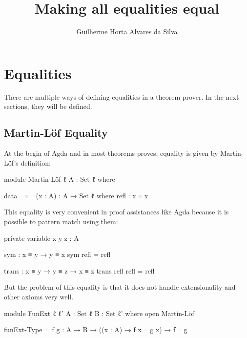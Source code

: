\documentclass{article}
\author{Guilherme Horta Alvares da Silva}
\title{Making all equalities equal}
\begin{document}


\maketitle

\begin{abstract}

\end{abstract}


\section{Equalities}

There are multiple ways of defining equalities in a theorem prover.
In the next sections, they will be defined.

\subsection{Martin-Löf Equality}

At the begin of Agda and in most theorems proves, equality is given by Martin-Löf's definition:

\begin{code}
module Martin-Löf {ℓ} {A : Set ℓ} where

  data _≡_ (x : A) : A → Set ℓ where
    refl : x ≡ x
\end{code}

This equality is very convenient in proof assistances like Agda because it is possible to pattern match using them:

\begin{code}
  private variable
    x y z : A

  sym  : x ≡ y → y ≡ x
  sym refl = refl

  trans : x ≡ y → y ≡ z → x ≡ z
  trans refl refl = refl
\end{code}

But the problem of this equality is that it does not handle extensionality and other axioms very well.

\begin{code}
module FunExt {ℓ ℓ'} {A : Set ℓ} {B : Set ℓ'} where
  open Martin-Löf

  funExt-Type = {f g : A → B}
    → ((x : A) → f x ≡ g x) → f ≡ g
\end{code}
\end{document}
